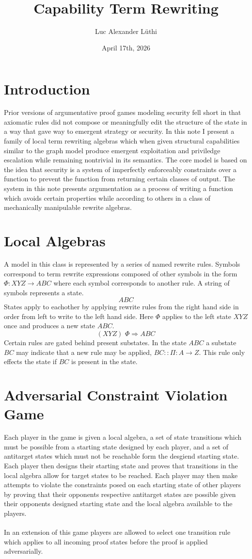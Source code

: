 \documentclass{article}
\title{Capability Term Rewriting}
\author{Luc Alexander L{\"u}thi}
\date{April 17th, 2026}
\begin{document}
	\maketitle
	\tableofcontents
	\section{Introduction}
	Prior versions of argumentative proof games modeling security fell short in that axiomatic rules did not compose or meaningfully edit the structure of the state in a way that gave way to emergent strategy or security. In this note I present a family of local term rewriting algebras which when given structural capabilities similar to the graph model produce emergent exploitation and priviledge escalation while remaining nontrivial in its semantics. The core model is based on the idea that security is a system of imperfectly enforceably constraints over a function to prevent the function from returning certain classes of output. The system in this note presents argumentation as a process of writing a function which avoids certain properties while according to others in a class of mechanically manipulable rewrite algebras.
	\section{Local Algebras}
	A model in this class is represented by a series of named rewrite rules. Symbols correspond to term rewrite expressions composed of other symbols in the form $\Phi: XYZ \rightarrow ABC$ where each symbol corresponds to another rule. A string of symbols represents a state.
	$$ABC$$
	States apply to eachother by applying rewrite rules from the right hand side in order from left to write to the left hand side. Here $\Phi$ applies to the left state $XYZ$ once and produces a new state $ABC$.
	$$(XYZ)\,\,\Phi \Rightarrow ABC$$
	Certain rules are gated behind present substates. In the state $ABC$ a substate $BC$ may indicate that a new rule may be applied, $BC :: \Pi: A \rightarrow Z$. This rule only effects the state if $BC$ is present in the state.
	\section{Adversarial Constraint Violation Game}
	Each player in the game is given a local algebra, a set of state transitions which must be possible from a starting state designed by each player, and a set of antitarget states which must not be reachable form the desgiend starting state. Each player then designs their starting state and proves that transitions in the local algebra allow for target states to be reached. Each player may then make attempts to violate the constraints posed on each starting state of other players by proving that their opponents respective antitarget states are possible given their opponents designed starting state and the local algebra available to the players.\\\\
	In an extension of this game players are allowed to select one transition rule which applies to all incoming proof states before the proof is applied adversarially. 
\end{document}
